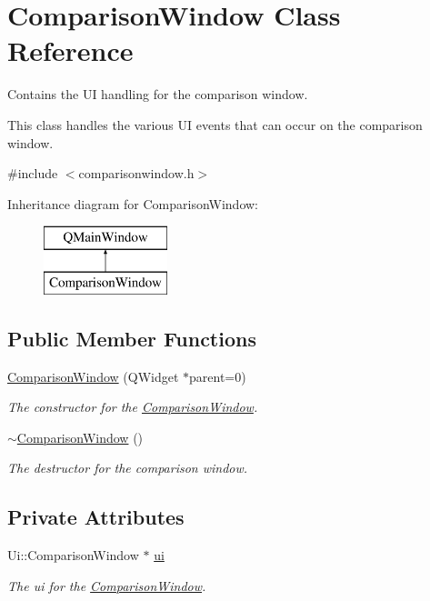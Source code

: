 \hypertarget{class_comparison_window}{}\section{Comparison\+Window Class Reference}
\label{class_comparison_window}


Contains the UI handling for the comparison window.

This class handles the various UI events that can occur on the comparison window.  




{\ttfamily \#include $<$comparisonwindow.\+h$>$}

Inheritance diagram for Comparison\+Window\+:\begin{figure}[H]
\begin{center}
\leavevmode
\includegraphics[height=2.000000cm]{dc/d87/class_comparison_window}
\end{center}
\end{figure}
\subsection*{Public Member Functions}
\begin{DoxyCompactItemize}
\item 
\mbox{\hyperlink{class_comparison_window_addc31fc48e96a30d630166cb377c3869}{Comparison\+Window}} (Q\+Widget $\ast$parent=0)
\begin{DoxyCompactList}\small\item\em The constructor for the \mbox{\hyperlink{class_comparison_window}{Comparison\+Window}}. \end{DoxyCompactList}\item 
\mbox{\hyperlink{class_comparison_window_a8f22c497b2b938378a4a51dc7e3ae8f2}{$\sim$\+Comparison\+Window}} ()
\begin{DoxyCompactList}\small\item\em The destructor for the comparison window. \end{DoxyCompactList}\end{DoxyCompactItemize}
\subsection*{Private Attributes}
\begin{DoxyCompactItemize}
\item 
Ui\+::\+Comparison\+Window $\ast$ \mbox{\hyperlink{class_comparison_window_a18eb77b5884a928a8b958907d1565acf}{ui}}
\begin{DoxyCompactList}\small\item\em The ui for the \mbox{\hyperlink{class_comparison_window}{Comparison\+Window}}. \end{DoxyCompactList}\end{DoxyCompactItemize}


